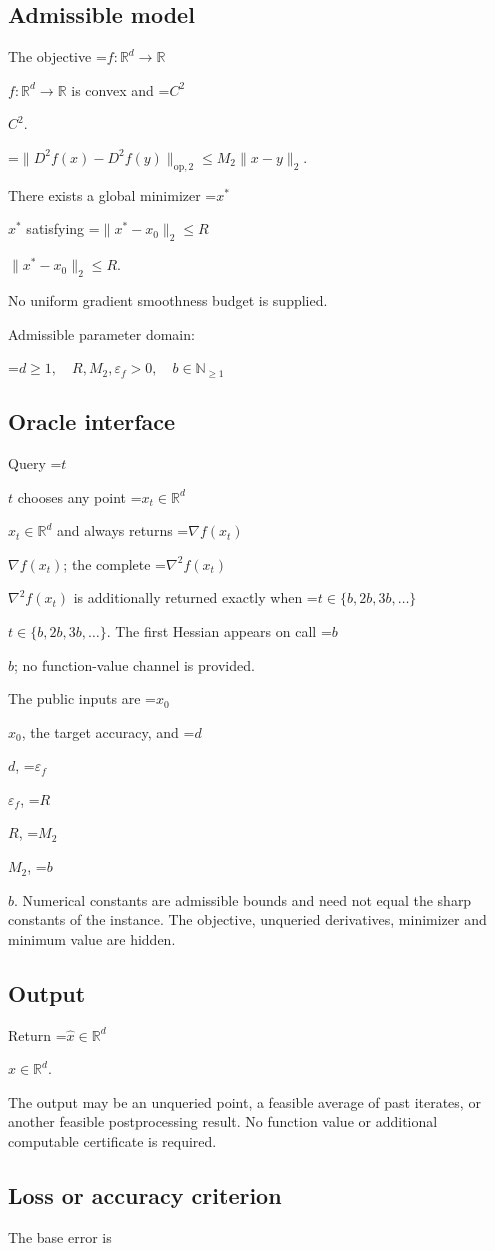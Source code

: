 \documentclass[10pt,a4paper]{article}
\newcommand{\AtlasMath}[1]{\par\begingroup\centering\setbox0=\hbox{$\displaystyle #1$}\ifdim\wd0>1.4\linewidth\typeout{ATLAS WIDE FORMULA: \the\wd0}\fi\ifdim\wd0>\linewidth\resizebox{\linewidth}{!}{\box0}\else\box0\fi\par\endgroup}
\newcommand{\AtlasInlineMath}[1]{\begingroup\setbox0=\hbox{$#1$}\ifdim\wd0>.4\linewidth\endgroup\AtlasMath{#1}\else\endgroup$#1$\fi}
\begin{document}
\subsection{Admissible model}
The objective \AtlasInlineMath{f:\mathbb{R}^d\to\mathbb{R}} is convex and \AtlasInlineMath{C^2}.


\AtlasMath{\|D^{2}f(x)-D^{2}f(y)\|_{\mathrm{op},2}\le M_2\|x-y\|_{2}.}


There exists a global minimizer \AtlasInlineMath{x^*} satisfying \AtlasInlineMath{\|x^*-x_0\|_2\le R}.

No uniform gradient smoothness budget is supplied.

Admissible parameter domain:


\AtlasMath{d\ge1,\quad R,M_2,\varepsilon_f>0,\quad b\in\mathbb{N}_{\ge1}}


\subsection{Oracle interface}
Query \AtlasInlineMath{t} chooses any point \AtlasInlineMath{x_t\in\mathbb{R}^d} and always returns \AtlasInlineMath{\nabla f(x_t)}; the complete \AtlasInlineMath{\nabla^2f(x_t)} is additionally returned exactly when \AtlasInlineMath{t\in\{b,2b,3b,\ldots\}}. The first Hessian appears on call \AtlasInlineMath{b}; no function-value channel is provided.

The public inputs are \AtlasInlineMath{x_0}, the target accuracy, and \AtlasInlineMath{d}, \AtlasInlineMath{\varepsilon_f}, \AtlasInlineMath{R}, \AtlasInlineMath{M_2}, \AtlasInlineMath{b}. Numerical constants are admissible bounds and need not equal the sharp constants of the instance. The objective, unqueried derivatives, minimizer and minimum value are hidden.

\subsection{Output}
Return \AtlasInlineMath{\widehat{x}\in \mathbb{R}^d}.

The output may be an unqueried point, a feasible average of past iterates, or another feasible postprocessing result. No function value or additional computable certificate is required.

\subsection{Loss or accuracy criterion}
The base error is
\end{document}
